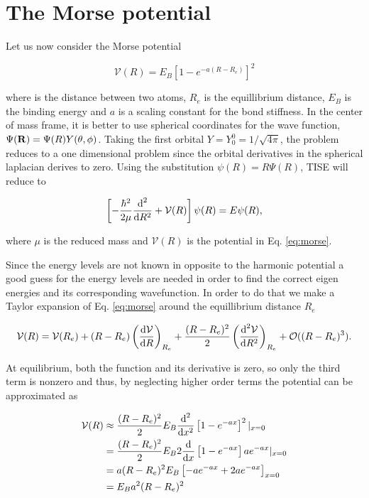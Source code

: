 \section{The Morse potential}

Let us now consider the Morse potential

\begin{equation}
  \label{eq:morse}
  \mathcal V(R) = E_B \left[ 1-e^{-a(R-R_e)} \right]^2
\end{equation}

where is the distance between two atoms, $R_e$ is the equillibrium distance, $E_B$ is the binding energy and $a$ is a scaling constant for the bond stiffness. In the center of mass frame, it is better to use spherical coordinates for the wave function, $\Psi(\mathbf{R}) = \Psi(R)Y(\theta,\phi)$. Taking the first orbital $Y = Y_0^0 = 1/\sqrt{4\pi}$, the problem reduces to a one dimensional problem since the orbital derivatives in the spherical laplacian derives to zero. Using the substitution $\psi (R) = R\Psi(R)$, TISE will reduce to

\begin{equation}
  \label{eq:spherTISE}
  \left[ -\frac{\hbar^2}{2\mu} \frac{\textnormal{d}^2}{\textnormal{d} R^2} + \mathcal V(R) \right]\psi(R) = E\psi(R),
\end{equation}

where $\mu$ is the reduced mass and $\mathcal V(R)$ is the potential in Eq. \eqref{eq:morse}.

Since the energy levels are not known in opposite to the harmonic potential a good guess for the energy levels are needed in order to find the correct eigen energies and its corresponding wavefunction. In order to do that we make a Taylor expansion of Eq. \eqref{eq:morse} around the equillibrium distance $R_e$

\begin{equation}
  \label{eq:taylor}
  \mathcal V(R) = \mathcal V(R_e) + (R-R_e)\left(\frac{\textnormal{d} \mathcal V}{\textnormal{d} R}\right)_{R_e} + \frac{(R-R_e)^2}{2}\left(\frac{\textnormal{d}^2 \mathcal V}{\textnormal{d} R^2}\right)_{R_e} + \mathcal O((R-R_e)^3).
\end{equation}

At equilibrium, both the function and its derivative is zero, so only the third term is nonzero and thus, by neglecting higher order terms the potential can be approximated as

\begin{equation}
  \label{eq:morseApprox}
  \begin{split}
  \mathcal V(R) &\approx \frac{(R-R_e)^2}{2} E_B \frac{\textnormal{d}^2}{\textnormal{d} x^2} \left[ 1-e^{-ax} \right]^2|_{x=0} \\
   & = \frac{(R-R_e)^2}{2} E_B 2 \frac{\textnormal{d}}{\textnormal{d} x} \left[1-e^{-ax}\right] a e^{-ax} |_{x=0}\\
   & = a(R-R_e)^2 E_B \left[ -a e^{-ax} +2a e^{-ax} \right]_{x=0} \\
   & = E_B a^2 (R-R_e)^2
  \end{split}
\end{equation}

